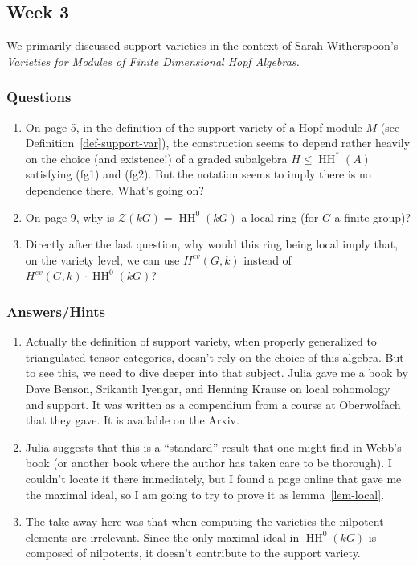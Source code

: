\documentclass[12pt]{article}
\theoremstyle{nonumberbreak}
\theoremstyle{changebreak}
\theoremstyle{nonumberplain}
\theoremstyle{change}
\DeclareMathOperator{\HH}{HH}
\begin{document}
\subsection{Week 3}
We primarily discussed support varieties in the context of Sarah Witherspoon's \textit{Varieties for Modules of Finite Dimensional Hopf Algebras.}\cite{witherspoon-expository}

\subsubsection{Questions}
\begin{enumerate}
	\item On page 5, in the definition of the support variety of a Hopf module $M$ (see Definition~\ref{def-support-var}),
	the construction seems to depend rather heavily on the choice (and existence!) of a graded subalgebra $H\le \HH^*(A)$
	satisfying (fg1) and (fg2). But the notation seems to imply there is no dependence there. What's going on?
	\item On page 9, why is $\mathcal{Z}(kG)=\HH^0(kG)$ a local ring (for $G$ a finite group)?
	\item Directly after the last question, why would this ring being local imply that, on the variety level,
	we can use $H^{ev}(G,k)$ instead of $H^{ev}(G,k)\cdot \HH^0(kG)$?
\end{enumerate}

\subsubsection{Answers/Hints}
\begin{enumerate}
	\item Actually the definition of support variety, when properly generalized to triangulated tensor categories,
	doesn't rely on the choice of this algebra. But to see this, we need to dive deeper into that subject. Julia gave 
	me a book by Dave Benson, Srikanth Iyengar, and Henning Krause on local cohomology and support. It was written
	as a compendium from a course at Oberwolfach that they gave. It is available on the Arxiv.
	\item Julia suggests that this is a ``standard'' result that one might find in Webb's book (or another book where the author has taken care to be thorough).
	I couldn't locate it there immediately, but I found a page online that gave me the maximal ideal, so I am going to try to prove it as lemma~\ref{lem-local}.
	\item The take-away here was that when computing the varieties the nilpotent elements are irrelevant. Since 
	the only maximal ideal in $\HH^0(kG)$ is composed of nilpotents, it doesn't contribute to the support variety.
\end{enumerate}
\end{document}
